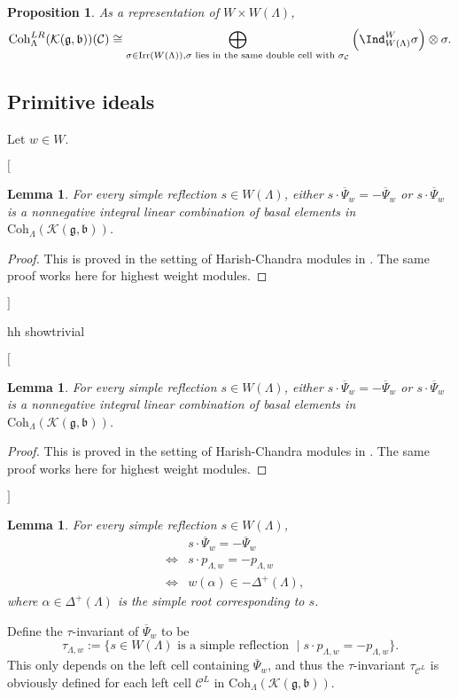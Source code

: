 \documentclass[12pt,a4paper]{amsart}
\newcommand{\trivial}[2][]{\if\relax\detokenize{#1}\relax
  {%
      \color{orange} \vspace{0em} $[$  #2 $]$
      \color{black}
  }
  \else
\ifx#1h
\ifcsname showtrivial\endcsname
{%
    \color{orange} \vspace{0em}  $[$ #2 $]$
    \color{black}
}
\fi
\else {\red Wrong argument!} \fi
\fi
}
\newcommand{\CC}{{\mathcal {C}}}
\newcommand{\CK}{{\mathcal {K}}}
\newcommand{\g}{\mathfrak g}
\renewcommand{\b}{\mathfrak b}
\numberwithin{equation}{section}
\newtheorem{lem}[thm]{Lemma}
\newtheorem{prop}[thm]{Proposition}
\theoremstyle{remark}
\def\Irr{\mathrm{Irr}}
\def\Coh{\mathrm{Coh}}
\begin{document}
\begin{prop}\label{dcrep}
As a representation of $W\times W(\Lambda)$,
\[
 \Coh^{LR}_{\Lambda}( \CK(\g,\b))( \CC)\cong \bigoplus_{\sigma\in \Irr(W(\Lambda)), \textrm{$\sigma$ lies in the same double cell with $\sigma_\CC$}} \left(\Ind_{W(\Lambda)}^W\sigma\right)\otimes \sigma.
\]
\end{prop}
\subsection{Primitive ideals}


Let $w\in W$.

\trivial[h]{
\begin{lem}
 For every simple reflection $s\in W(\Lambda)$, either $s\cdot  \overline \Psi_w=- \overline \Psi_w$ or $s\cdot  \overline \Psi_w$ is a nonnegative integral linear combination of basal elements in $\Coh_{\Lambda}( \CK(\g,\b))$.
 \end{lem}
\begin{proof}
This is proved in the setting of Harish-Chandra modules in \cite[Corollary 7.3.9]{Vg}. The same proof works here for highest weight modules.

\end{proof}

}
\begin{lem}
 For every simple reflection $s\in W(\Lambda)$,
\begin{eqnarray*}
&&
s\cdot  \overline \Psi_w=- \overline \Psi_w\\
&\Longleftrightarrow & s\cdot p_{\Lambda,w}=-p_{\Lambda, w}\\
  &  \Longleftrightarrow &  w(\alpha)\in -\Delta^+(\Lambda),
  \end{eqnarray*}
where $\alpha\in \Delta^+(\Lambda)$ is the simple root corresponding to $s$.
\end{lem}

Define the $\tau$-invariant of $ \overline \Psi_w$ to be
\[
  \tau_{\Lambda, w}:=\{s\in W(\Lambda) \textrm{ is a simple reflection }\mid   s\cdot p_{\Lambda,w}=-p_{\Lambda, w}\}.
\]
This only depends on the left cell containing $\overline \Psi_w$, and thus the $\tau$-invariant $\tau_{\CC^L}$ is obviously defined for each left cell $\CC^L$ in  $\Coh_{\Lambda}( \CK(\g,\b))$.




\end{document}
